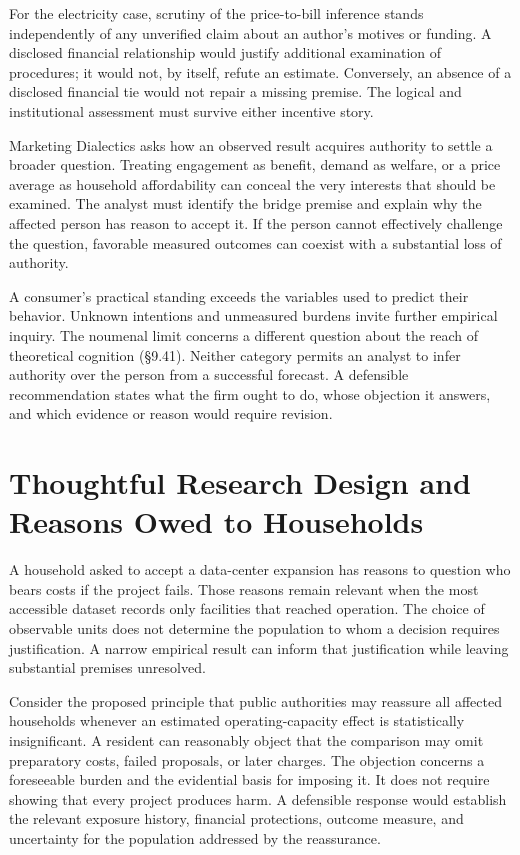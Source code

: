 For the electricity case, scrutiny of the price-to-bill inference stands
independently of any unverified claim about an author's motives or
funding. A disclosed financial relationship would justify additional
examination of procedures; it would not, by itself, refute an estimate.
Conversely, an absence of a disclosed financial tie would not repair a
missing premise. The logical and institutional assessment must survive
either incentive story.

Marketing Dialectics asks how an observed result acquires authority to
settle a broader question. Treating engagement as benefit, demand as
welfare, or a price average as household affordability can conceal the
very interests that should be examined. The analyst must identify the
bridge premise and explain why the affected person has reason to accept
it. If the person cannot effectively challenge the question, favorable
measured outcomes can coexist with a substantial loss of authority.

A consumer's practical standing exceeds the variables used to predict
their behavior. Unknown intentions and unmeasured burdens invite further
empirical inquiry. The noumenal limit concerns a different question
about the reach of theoretical cognition (§9.41). Neither category
permits an analyst to infer authority over the person from a successful
forecast. A defensible recommendation states what the firm ought to do,
whose objection it answers, and which evidence or reason would require
revision.


\hypertarget{M09-thoughtful-research-design-and-reasons-owed-to-households}{%
\section{Thoughtful Research Design and Reasons Owed to
Households}\label{M09-thoughtful-research-design-and-reasons-owed-to-households}}

\noindent \noindent A household asked to accept a data-center expansion has
reasons to question who bears costs if the project fails. Those reasons
remain relevant when the most accessible dataset records only facilities
that reached operation. The choice of observable units does not
determine the population to whom a decision requires justification. A
narrow empirical result can inform that justification while leaving
substantial premises unresolved.

Consider the proposed principle that public authorities may reassure all
affected households whenever an estimated operating-capacity effect is
statistically insignificant. A resident can reasonably object that the
comparison may omit preparatory costs, failed proposals, or later
charges. The objection concerns a foreseeable burden and the evidential
basis for imposing it. It does not require showing that every project
produces harm. A defensible response would establish the relevant
exposure history, financial protections, outcome measure, and
uncertainty for the population addressed by the reassurance.

